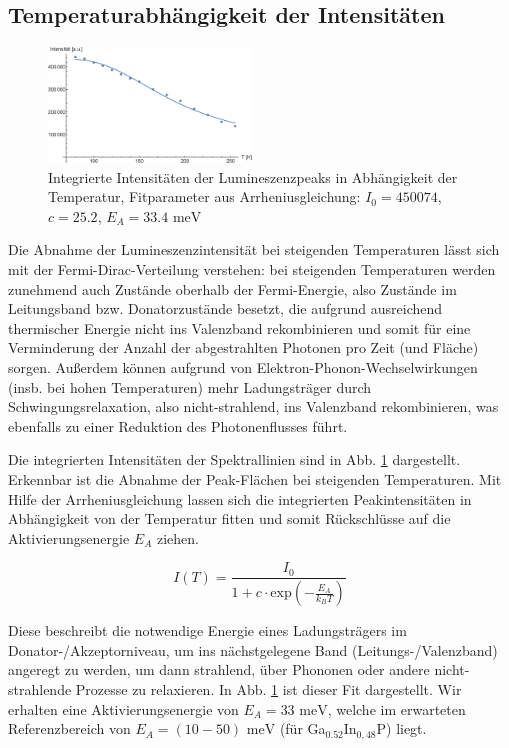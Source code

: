 \documentclass[aps,twocolumn,secnumarabic,nobalancelastpage,amsmath,amssymb,
nofootinbib,superscriptaddress]{revtex4-1}
\begin{document}
\subsection{Temperaturabhängigkeit der Intensitäten}

\begin{figure}[b]
  \centering
  \includegraphics[width=0.48\textwidth]{../Messung/integrintenstempfit.eps}
  \caption{\label{fig:intInt}Integrierte Intensitäten der Lumineszenzpeaks in Abhängigkeit
  der Temperatur,
  Fitparameter aus Arrheniusgleichung: $I_0=450074$, $c=25.2$, $E_A=33.4\text{ meV}$}
\end{figure}

\noindent Die Abnahme der Lumineszenzintensität bei steigenden Temperaturen lässt sich mit der Fermi-Dirac-Verteilung
verstehen: bei steigenden Temperaturen werden zunehmend auch Zustände oberhalb der Fermi-Energie, also Zustände
im Leitungsband bzw. Donatorzustände besetzt, die aufgrund ausreichend thermischer Energie nicht ins Valenzband
rekombinieren und somit für eine Verminderung der Anzahl der abgestrahlten Photonen pro Zeit (und Fläche) sorgen.
Außerdem können aufgrund von Elektron-Phonon-Wechselwirkungen (insb. bei hohen Temperaturen) mehr Ladungsträger durch
Schwingungsrelaxation, also nicht-strahlend, ins Valenzband rekombinieren, was ebenfalls zu einer Reduktion des
Photonenflusses führt.

Die integrierten Intensitäten der Spektrallinien sind in Abb. \ref{fig:intInt} dargestellt. Erkennbar ist
die Abnahme der Peak-Flächen bei steigenden Temperaturen. Mit Hilfe der Arrheniusgleichung lassen sich die integrierten
Peakintensitäten in Abhängigkeit von der Temperatur fitten und somit Rückschlüsse auf die Aktivierungsenergie $E_A$ ziehen.

  \begin{equation}
    I(T) = \frac{I_0}{1+c\cdot\text{exp}\left( -\frac{E_A}{k_B T} \right)}
  \end{equation}

\noindent Diese beschreibt die notwendige Energie eines Ladungsträgers im Donator-/Akzeptorniveau, um ins nächstgelegene Band
(Leitungs-/Valenzband) angeregt zu werden, um dann strahlend, über Phononen oder andere nicht-strahlende Prozesse zu relaxieren.
In Abb. \ref{fig:intInt} ist dieser Fit dargestellt. Wir erhalten eine Aktivierungsenergie von $E_A=33 \text{ meV}$, welche im erwarteten
Referenzbereich von $E_A=(10-50)\text{ meV}$ (für Ga$_{0.52}$In$_{0,48}$P) \cite{eact} liegt.
\end{document}
